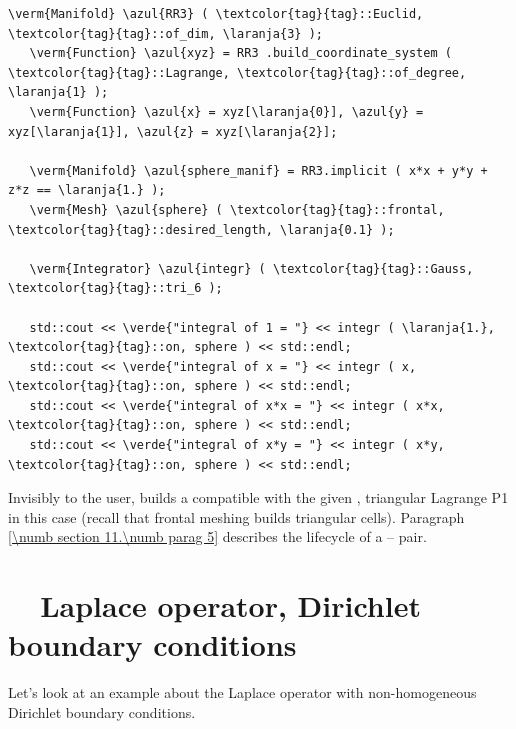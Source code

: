 \begin{Verbatim}[commandchars=\\\{\},formatcom=\small\tt,frame=single,
   label=parag-\ref{\numb section 6.\numb parag 2}.cpp,rulecolor=\color{moldura},
   baselinestretch=0.94,framesep=2mm                                            ]
   \verm{Manifold} \azul{RR3} ( \textcolor{tag}{tag}::Euclid, \textcolor{tag}{tag}::of_dim, \laranja{3} );
   \verm{Function} \azul{xyz} = RR3 .build_coordinate_system ( \textcolor{tag}{tag}::Lagrange, \textcolor{tag}{tag}::of_degree, \laranja{1} );
   \verm{Function} \azul{x} = xyz[\laranja{0}], \azul{y} = xyz[\laranja{1}], \azul{z} = xyz[\laranja{2}];

   \verm{Manifold} \azul{sphere_manif} = RR3.implicit ( x*x + y*y + z*z == \laranja{1.} );
   \verm{Mesh} \azul{sphere} ( \textcolor{tag}{tag}::frontal, \textcolor{tag}{tag}::desired_length, \laranja{0.1} );

   \verm{Integrator} \azul{integr} ( \textcolor{tag}{tag}::Gauss, \textcolor{tag}{tag}::tri_6 );

   std::cout << \verde{"integral of 1 = "} << integr ( \laranja{1.}, \textcolor{tag}{tag}::on, sphere ) << std::endl;
   std::cout << \verde{"integral of x = "} << integr ( x, \textcolor{tag}{tag}::on, sphere ) << std::endl;
   std::cout << \verde{"integral of x*x = "} << integr ( x*x, \textcolor{tag}{tag}::on, sphere ) << std::endl;
   std::cout << \verde{"integral of x*y = "} << integr ( x*y, \textcolor{tag}{tag}::on, sphere ) << std::endl;
\end{Verbatim}

Invisibly to the user, {\maniFEM} builds a {\small\tt{}} compatible with the
given {\small\tt{}}, triangular Lagrange P1 in this case
(recall that frontal meshing builds triangular cells).
Paragraph \ref{\numb section 11.\numb parag 5} describes the lifecycle of a
{\small\tt{}} -- {\small\tt{}} pair.


\section{~~Laplace operator, Dirichlet boundary conditions}\label{\numb section 6.\numb parag 3}

Let's look at an example about the Laplace operator with non-homogeneous Dirichlet
boundary conditions.

